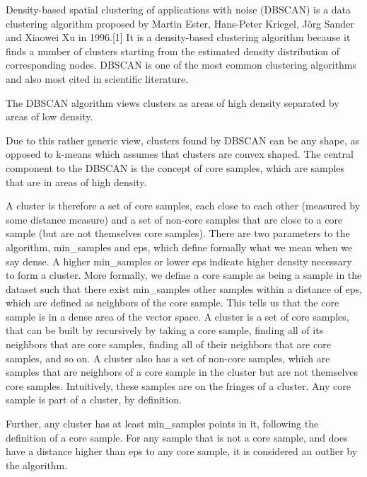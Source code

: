 Density-based spatial clustering of applications with noise (DBSCAN) is a data clustering algorithm proposed by Martin Ester, Hans-Peter Kriegel, Jörg Sander and Xiaowei Xu in 1996.[1] It is a density-based clustering algorithm because it finds a number of clusters starting from the estimated density distribution of corresponding nodes. DBSCAN is one of the most common clustering algorithms and also most cited in scientific literature.


The DBSCAN algorithm views clusters as areas of high density separated by areas of low density. 

Due to this rather generic view, clusters found by DBSCAN can be any shape, as opposed to k-means which assumes that clusters are convex shaped. 
The central component to the DBSCAN is the concept of core samples, which are samples that are in areas of high density. 

A cluster is therefore a set of core samples, each close to each other (measured by some distance measure) and a set of non-core samples that are close to a core sample (but are not themselves core samples). There are two parameters to the algorithm, min_samples and eps, which define formally what we mean when we say dense. A higher min_samples or lower eps indicate higher density necessary to form a cluster.
More formally, we define a core sample as being a sample in the dataset such that there exist min_samples other samples within a distance of eps, which are defined as neighbors of the core sample. This tells us that the core sample is in a dense area of the vector space. A cluster is a set of core samples, that can be built by recursively by taking a core sample, finding all of its neighbors that are core samples, finding all of their neighbors that are core samples, and so on. A cluster also has a set of non-core samples, which are samples that are neighbors of a core sample in the cluster but are not themselves core samples. Intuitively, these samples are on the fringes of a cluster.
Any core sample is part of a cluster, by definition. 

Further, any cluster has at least min_samples points in it, following the definition of a core sample. 
For any sample that is not a core sample, and does have a distance higher than eps to any core sample, it is considered an outlier by the algorithm.

